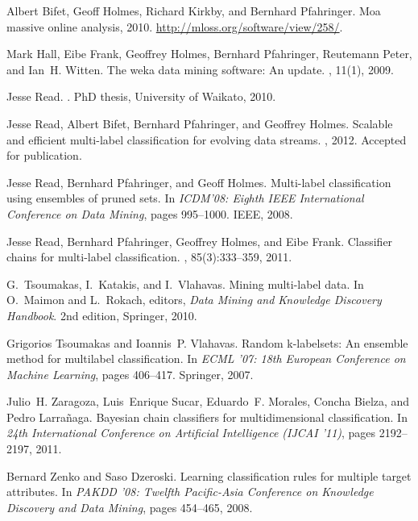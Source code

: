 \begin{thebibliography}{10}

Albert Bifet, Geoff Holmes, Richard Kirkby, and Bernhard Pfahringer.
\newblock Moa massive online analysis, 2010.
\newblock \url{http://mloss.org/software/view/258/}.

Mark Hall, Eibe Frank, Geoffrey Holmes, Bernhard Pfahringer, Reutemann Peter,
  and Ian~H. Witten.
\newblock The weka data mining software: An update.
, 11(1), 2009.

Jesse Read.
.
\newblock PhD thesis, University of Waikato, 2010.

Jesse Read, Albert Bifet, Bernhard Pfahringer, and Geoffrey Holmes.
\newblock Scalable and efficient multi-label classification for evolving data
  streams.
, 2012.
\newblock Accepted for publication.

Jesse Read, Bernhard Pfahringer, and Geoff Holmes.
\newblock Multi-label classification using ensembles of pruned sets.
\newblock In {\em ICDM'08: Eighth IEEE International Conference on Data
  Mining}, pages 995--1000. IEEE, 2008.

Jesse Read, Bernhard Pfahringer, Geoffrey Holmes, and Eibe Frank.
\newblock Classifier chains for multi-label classification.
, 85(3):333--359, 2011.

G.~Tsoumakas, I.~Katakis, and I.~Vlahavas.
\newblock Mining multi-label data.
\newblock In O.~Maimon and L.~Rokach, editors, {\em Data Mining and Knowledge
  Discovery Handbook}. 2nd edition, Springer, 2010.

Grigorios Tsoumakas and Ioannis~P. Vlahavas.
\newblock Random k-labelsets: An ensemble method for multilabel classification.
\newblock In {\em ECML '07: 18th European Conference on Machine Learning},
  pages 406--417. Springer, 2007.

Julio~H. Zaragoza, Luis~Enrique Sucar, Eduardo~F. Morales, Concha Bielza, and
  Pedro Larra{\~n}aga.
\newblock Bayesian chain classifiers for multidimensional classification.
\newblock In {\em 24th International Conference on Artificial Intelligence
  (IJCAI '11)}, pages 2192--2197, 2011.

Bernard Zenko and Saso Dzeroski.
\newblock Learning classification rules for multiple target attributes.
\newblock In {\em PAKDD '08: Twelfth Pacific-Asia Conference on Knowledge
  Discovery and Data Mining}, pages 454--465, 2008.

\end{thebibliography}
